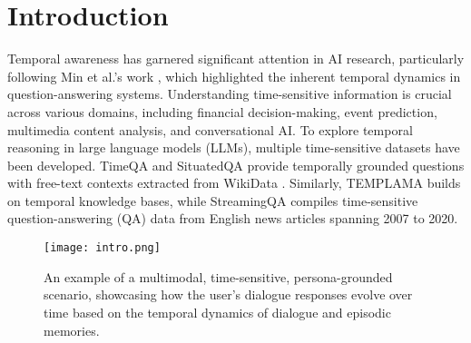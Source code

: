 \section{Introduction}
Temporal awareness has garnered significant attention in AI research, particularly following Min et al.’s work \cite{min2020ambigqa}, which highlighted the inherent temporal dynamics in question-answering systems. Understanding time-sensitive information is crucial across various domains, including financial decision-making, event prediction, multimedia content analysis, and conversational AI. To explore temporal reasoning in large language models (LLMs), multiple time-sensitive datasets have been developed. TimeQA \cite{chen2021dataset} and SituatedQA \cite{zhang2021situatedqa} provide temporally grounded questions with free-text contexts extracted from WikiData \cite{vrandevcic2014wikidata}. Similarly, TEMPLAMA \cite{dhingra2022time} builds on temporal knowledge bases, while StreamingQA \cite{liska2022streamingqa} compiles time-sensitive question-answering (QA) data from English news articles spanning 2007 to 2020.

\begin{figure}[t]
\centering
\texttt{[image: intro.png]}
\caption{An example of a multimodal, time-sensitive, persona-grounded scenario, showcasing how the user's dialogue responses evolve over time based on the temporal dynamics of dialogue and episodic memories.
}
\vspace{-3mm}
\label{intro}
\end{figure}

